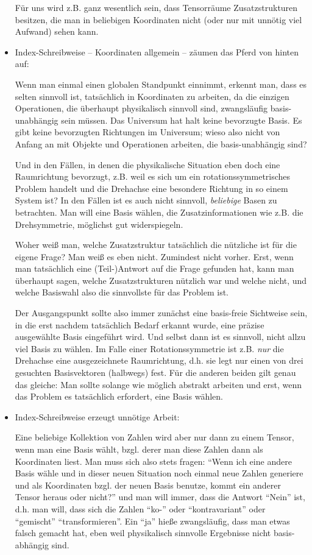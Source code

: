 \begin{remark}
\begin{itemize}
Für uns wird z.B. ganz wesentlich sein, dass Tensorräume Zusatzstrukturen besitzen, die man in beliebigen Koordinaten nicht (oder nur mit unnötig viel Aufwand) sehen kann.

\item Index-Schreibweise -- Koordinaten allgemein -- zäumen das Pferd von hinten auf:

Wenn man einmal einen globalen Standpunkt einnimmt, erkennt man, dass es selten sinnvoll ist, tatsächlich in Koordinaten zu arbeiten, da die einzigen Operationen, die überhaupt physikalisch sinnvoll sind, zwangsläufig basis-unabhängig sein müssen. Das Universum hat halt keine bevorzugte Basis. Es gibt keine bevorzugten Richtungen im Universum; wieso also nicht von Anfang an mit Objekte und Operationen arbeiten, die basis-unabhängig sind?

Und in den Fällen, in denen die physikalische Situation eben doch eine Raumrichtung bevorzugt, z.B. weil es sich um ein rotationssymmetrisches Problem handelt und die Drehachse eine besondere Richtung in so einem System ist? In den Fällen ist es auch nicht sinnvoll, \emph{beliebige} Basen zu betrachten. Man will eine Basis wählen, die Zusatzinformationen wie z.B. die Drehsymmetrie, möglichst gut widerspiegeln.

Woher weiß man, welche Zusatzstruktur tatsächlich die nützliche ist für die eigene Frage? Man weiß es eben nicht. Zumindest nicht vorher. Erst, wenn man tatsächlich eine (Teil-)Antwort auf die Frage gefunden hat, kann man überhaupt sagen, welche Zusatzstrukturen nützlich war und welche nicht, und welche Basiswahl also die sinnvollste für das Problem ist.

Der Ausgangspunkt sollte also immer zunächst eine basis-freie Sichtweise sein, in die erst nachdem tatsächlich Bedarf erkannt wurde, eine präzise ausgewählte Basis eingeführt wird. Und selbst dann ist es sinnvoll, nicht allzu viel Basis zu wählen. Im Falle einer Rotationssymmetrie ist z.B. \emph{nur} die Drehachse eine ausgezeichnete Raumrichtung, d.h. sie legt nur einen von drei gesuchten Basisvektoren (halbwegs) fest. Für die anderen beiden gilt genau das gleiche: Man sollte solange wie möglich abstrakt arbeiten und erst, wenn das Problem es tatsächlich erfordert, eine Basis wählen.

\item Index-Schreibweise erzeugt unnötige Arbeit:

Eine beliebige Kollektion von Zahlen wird aber nur dann zu einem Tensor, wenn man eine Basis wählt, bzgl. derer man diese Zahlen dann als Koordinaten liest. Man muss sich also stets fragen: \enquote{Wenn ich eine andere Basis wähle und in dieser neuen Situation noch einmal neue Zahlen generiere und als Koordinaten bzgl. der neuen Basis benutze, kommt ein anderer Tensor heraus oder nicht?} und man will immer, dass die Antwort \enquote{Nein} ist, d.h. man will, dass sich die Zahlen \enquote{ko-} oder \enquote{kontravariant} oder \enquote{gemischt} \enquote{transformieren}. Ein \enquote{ja} hieße zwangsläufig, dass man etwas falsch gemacht hat, eben weil physikalisch sinnvolle Ergebnisse nicht basis-abhängig sind.


\end{itemize}
\end{remark}
